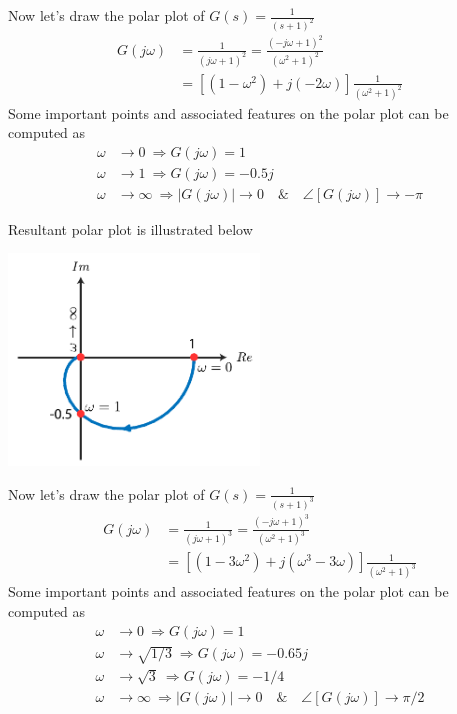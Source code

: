 \documentclass[twoside]{article}
\begin{document}
\vspace{6 pt}

Now let's draw the polar plot of  $G(s) = \frac{1}{(s+1)^2}$
%
\begin{align*}
  G(j \omega ) &= \frac{1}{ (j \omega + 1)^2 } = \frac{ (-j \omega + 1)^2 }{( \omega^2 +1 )^2 }
\\
&= \left[ \left( 1 - \omega^2 \right) + j ( - 2 \omega) \right] \frac{1}{( \omega^2 +1 )^2 }
\end{align*}
%
Some important points and associated features on the polar plot can be computed as
\begin{align*}
  \omega &\to 0 \ \Rightarrow G(j \omega) = 1
\\
 \omega &\to 1 \ \Rightarrow G(j \omega) = -0.5 j 
\\
 \omega &\to  \infty \ \Rightarrow | G(j \omega) | \to 0 \quad \& \quad \angle  [ G(j \omega) ] \to -\pi
\end{align*}

Resultant polar plot is illustrated below

\vspace{6 pt}

  \begin{minipage}[h]{1\linewidth}
    \begin{center}
      \includegraphics[width=0.5\textwidth]{polar4}
    \end{center}
  \end{minipage}

\vspace{6 pt}

Now let's draw the polar plot of  $G(s) = \frac{1}{(s+1)^3}$
%
\begin{align*}
  G(j \omega ) &= \frac{1}{ (j \omega + 1)^3 } = \frac{ (-j \omega + 1)^3 }{( \omega^2 +1 )^3 }
\\
&= \left[ \left( 1 - 3 \omega^2 \right) + j (\omega^3 - 3 \omega) \right] \frac{1}{( \omega^2 +1 )^3 }
\end{align*}
%
Some important points and associated features on the polar plot can be computed as
\begin{align*}
  \omega &\to 0 \ \Rightarrow G(j \omega) = 1
\\
 \omega &\to \sqrt{1/3} \ \Rightarrow G(j \omega) = -0.65 j 
\\
 \omega &\to \sqrt{3} \ \Rightarrow G(j \omega) = -1/4 
\\
 \omega &\to  \infty \ \Rightarrow | G(j \omega) | \to 0 \quad \& \quad \angle  [ G(j \omega) ] \to \pi/2
\end{align*}
\end{document}
